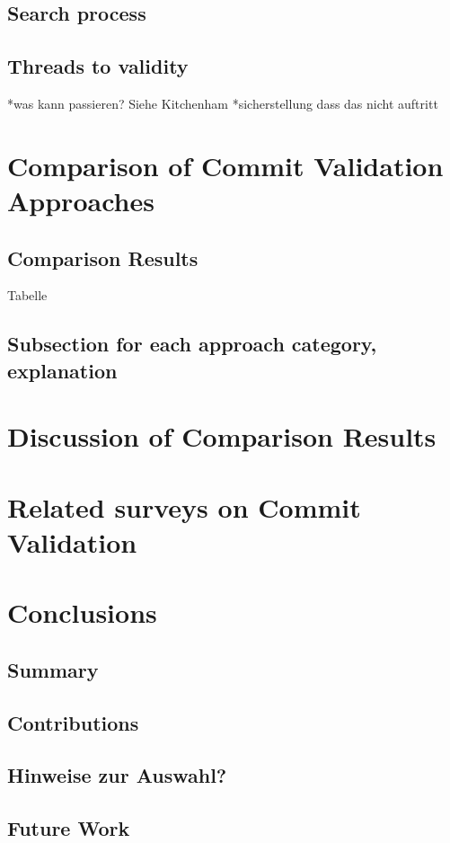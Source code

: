 \subsection{Search process}
\subsection{Threads to validity}
*was kann passieren? Siehe Kitchenham
*sicherstellung dass das nicht auftritt
\section{Comparison of Commit Validation Approaches}
\subsection{Comparison Results}
Tabelle
\subsection{Subsection for each approach category, explanation}
\section{Discussion of Comparison Results}
\section{Related surveys on Commit Validation}
\cite{Kim2008,Catolino2019,Syed2019,Yang2016}
\section{Conclusions}
\subsection{Summary}
\subsection{Contributions}
\subsection{Hinweise zur Auswahl?}
\subsection{Future Work}